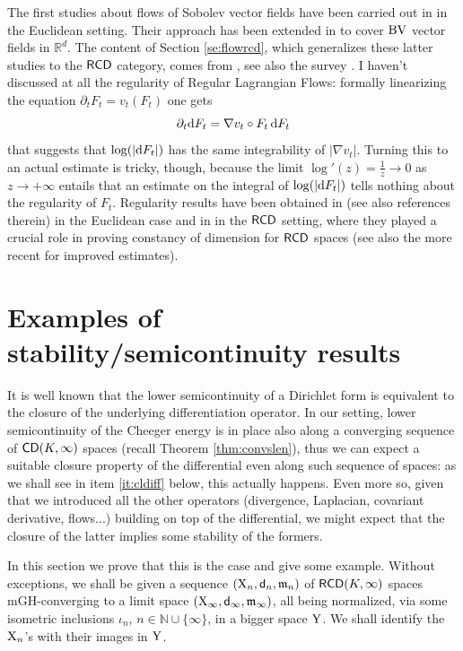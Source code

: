 \documentclass[11pt]{article}
\numberwithin{equation}{section}
\newcommand{\N}{\mathbb{N}}
\newcommand{\R}{\mathbb{R}}
\newcommand{\X}{{\rm X}}
\newcommand{\Y}{{\rm Y}}
\newcommand{\sfd}{{\sf d}}
\newcommand{\mm}{{\mathfrak m}}
\newcommand{\BV}{{\rm BV}}
\newcommand{\CD}{{\sf CD}}
\newcommand{\RCD}{{\sf RCD}}
\renewcommand{\d}{{\rm d}}
\begin{document}
{The first studies about flows of Sobolev vector fields have been carried out   in  \cite{DiPerna-Lions89} in the Euclidean setting. Their approach has been extended  in \cite{Ambrosio04} to cover $\BV$ vector fields in $\R^d$. The content of Section \ref{se:flowrcd}, which generalizes these latter studies to the $\RCD$ category, comes from  \cite{Ambrosio-Trevisan14}, see also the survey \cite{AT15}. I haven't discussed at all the regularity of Regular Lagrangian Flows: formally linearizing the equation $\partial_t F_t=v_t(F_t)$ one gets 
\[
\partial_t\d F_t=\nabla v_t\circ F_t\,\d F_t
\]
that suggests that $\log(|\d F_t|)$ has the same integrability of $|\nabla v_t|$. Turning this to an actual estimate is tricky, though, because the limit $\log'(z)=\tfrac1z\to0$ as $z\to+\infty$ entails that an estimate on the integral of $\log(|\d F_t|)$ tells nothing about the regularity of $F_t$. Regularity results have been obtained in \cite{CDL08} (see also references therein) in the Euclidean case and in \cite{BS18} in the $\RCD$ setting, where they played a crucial role in proving constancy of dimension for $\RCD$ spaces (see also the more recent \cite{BDS21} for improved estimates).

}

\section{Examples of  stability/semicontinuity results}
It is well known that the lower semicontinuity of a Dirichlet form is equivalent to the closure of the underlying differentiation operator. In our setting, lower semicontinuity of the Cheeger energy is in place also along a converging sequence of $\CD(K,\infty)$ spaces (recall Theorem \ref{thm:convslen}), thus we can expect a suitable closure property of the differential even along such sequence of spaces: as we shall see in item \ref{it:cldiff} below, this actually happens. Even more so, given that we introduced all the other  operators (divergence, Laplacian,  covariant derivative, flows...)  building on top of the differential, we might expect that the closure of the latter implies some stability of the formers.



In this section we prove that this is the case  and give some example. Without exceptions, we shall be given a sequence $(\X_n,\sfd_n,\mm_n)$ of  $\RCD(K,\infty)$ spaces mGH-converging to a limit space $(\X_\infty,\sfd_\infty,\mm_\infty)$, all being normalized, via some isometric inclusions $\iota_n$, $n\in\N\cup\{\infty\}$, in a bigger space $\Y$. We shall identify the $\X_n$'s with their images in $\Y$.
\end{document}
